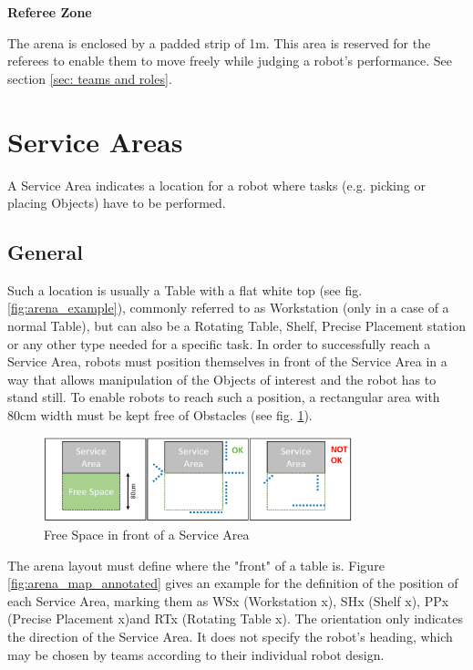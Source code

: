 \textbf{Referee Zone}

The arena is enclosed by a padded strip of 1m. This area is reserved for the referees to enable them to move freely while judging a robot's performance. See section \ref{sec: teams and roles}.


\clearpage

\section{Service Areas}
\label{sec:Service_Areas}
A Service Area indicates a location for a robot where tasks (e.g. picking or placing Objects) have to be performed.
\subsection{General} 
\label{subsec:Service_Areas_General}


Such a location is usually a Table with a flat white top (see fig. \ref{fig:arena_example}), commonly referred to as Workstation (only in a case of a normal Table), but can also be a Rotating Table, Shelf, Precise Placement station or any other type needed for a specific task.
In order to successfully reach a Service Area, robots must position themselves in front of the Service Area in a way that allows manipulation of the Objects of interest and the robot has to stand still. To enable robots to reach such a position, a rectangular area with $80\si{\centi\meter}$ width must be kept free of Obstacles (see fig. \ref{fig:arena_service_area_free}). 

\begin{figure} [h!]
	\centering
	\includegraphics[width= 0.8\textwidth ]{./images/general_rules/arena_service_area_free_space}
	\caption{Free Space in front of a Service Area}
	\label{fig:arena_service_area_free}
\end{figure}

The arena layout must define where the "front" of a table is.
Figure \ref{fig:arena_map_annotated} gives an example for the definition of the position of each Service Area, marking them as WSx (Workstation x), SHx (Shelf x), PPx (Precise Placement x)and RTx (Rotating Table x). The orientation only indicates the direction of the Service Area. It does not specify the robot's heading, which may be chosen by teams according to their individual robot design.

